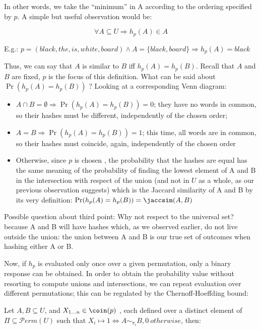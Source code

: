 	In other words, we take the ``minimum'' in A according to the ordering specified by $p$. A simple but useful observation would be:
	
	\begin{equation}
	\forall A \subseteq U \Rightarrow h_p(A) \in A
	\end{equation}
	
	E.g.: $p = (black, the, is, white, board) \wedge A = \{black, board\} \Rightarrow h_p(A) = black$
	
	Thus, we can say that $A$ is similar to $B$ iff $h_p(A)=h_p(B)$. Recall that $A$ and $B$ are fixed, $p$ is the focus of this definition. What can be said about $\Pr(h_p(A)=h_p(B))$ ? Looking at a corresponding Venn diagram:
	
	\begin{itemize}
	\item $A \cap B = \emptyset \Rightarrow \Pr(h_p(A)=h_p(B)) = 0$; they have no words in common, so their hashes must be different, independently of the chosen order;
	\item $A = B \Rightarrow \Pr(h_p(A)=h_p(B)) = 1$; this time, all words are in common, so their hashes must coincide, again, independently of the chosen order
	\item Otherwise, since $p$ is chosen \uar, the probability that the hashes are equal has the same meaning of the probability of finding the lowest element of A and B in the intersection with respect of the union (and not in $U$ as a whole, as our previous observation suggests) which is the Jaccard similarity of A and B by its very definition: $\Pr(h_p(A)=h_p(B)) = \jaccsim(A, B)$
	\end{itemize}
	
	Possible question about third point: Why not respect to the universal set? because A and B will have hashes which, as we observed earlier, do not live outside the union: the union between A and B is our true set of outcomes when hashing either A or B.
	
	Now, if $h_p$ is evaluated only once over a given permutation, only a binary response can be obtained. In order to obtain the probability value without resorting to compute unions and intersections, we can repeat evaluation over different permutations; this can be regulated by the Chernoff-Hoeffding bound:
	
	Let $A, B \subseteq U$, and $X_{1 \dots n} \in \coin(p)$ \iid, each defined over a distinct element of $\Pi \subseteq \mathcal{P}erm(U)$ such that $X_i \mapsto 1 \Leftrightarrow A \sim_{\pi_i} B, 0\ otherwise$, then:
	
